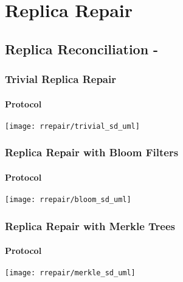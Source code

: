 \chapter{Replica Repair}
\label{chapter.rrepair}

\section{Replica Reconciliation - }

\subsection{Trivial Replica Repair}
\subsubsection{Protocol}
\texttt{[image: rrepair/trivial\_sd\_uml]}

\subsection{Replica Repair with Bloom Filters}
\subsubsection{Protocol}
\texttt{[image: rrepair/bloom\_sd\_uml]}

\subsection{Replica Repair with Merkle Trees}
\subsubsection{Protocol}
\texttt{[image: rrepair/merkle\_sd\_uml]}



